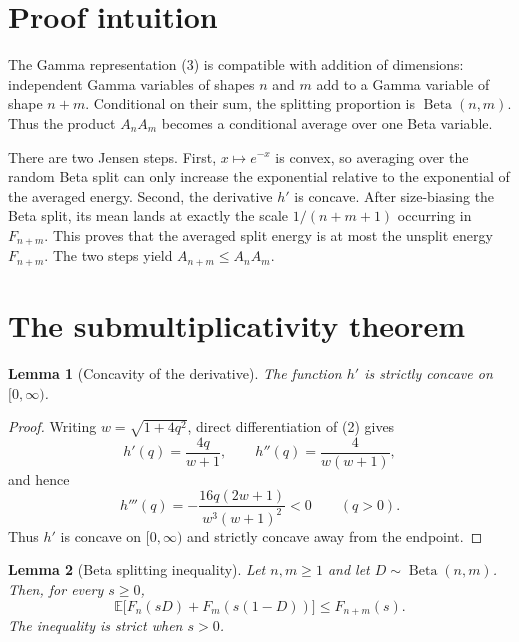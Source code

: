 \documentclass[11pt]{article}
\newtheorem{lemma}{Lemma}
\newcommand{\E}{\mathbb E}
\begin{document}
\section{Proof intuition}

The Gamma representation (3) is compatible with addition of dimensions:
independent Gamma variables of shapes $n$ and $m$ add to a Gamma variable of
shape $n+m$.  Conditional on their sum, the splitting proportion is
$\operatorname{Beta}(n,m)$.  Thus the product $A_nA_m$ becomes a conditional
average over one Beta variable.

There are two Jensen steps.  First, $x\mapsto e^{-x}$ is convex, so averaging
over the random Beta split can only increase the exponential relative to the
exponential of the averaged energy.  Second, the derivative $h'$ is concave.
After size-biasing the Beta split, its mean lands at exactly the scale
$1/(n+m+1)$ occurring in $F_{n+m}$.  This proves that the averaged split
energy is at most the unsplit energy $F_{n+m}$.  The two steps yield
$A_{n+m}\leq A_nA_m$.

\section{The submultiplicativity theorem}

\begin{lemma}[Concavity of the derivative]\label{lem:concavity}
The function $h'$ is strictly concave on $[0,\infty)$.
\end{lemma}

\begin{proof}
Writing $w=\sqrt{1+4q^2}$, direct differentiation of (2) gives
\[
  h'(q)=\frac{4q}{w+1},
  \qquad
  h''(q)=\frac{4}{w(w+1)},
\]
and hence
\[
  h'''(q)=-\frac{16q(2w+1)}{w^3(w+1)^2}<0
  \qquad(q>0).
\]
Thus $h'$ is concave on $[0,\infty)$ and strictly concave away from the
endpoint.
\end{proof}

\begin{lemma}[Beta splitting inequality]\label{lem:beta}
Let $n,m\geq1$ and let $D\sim\operatorname{Beta}(n,m)$.  Then, for every
$s\geq0$,
\[
  \E\bigl[F_n(sD)+F_m(s(1-D))\bigr]\leq F_{n+m}(s).       \tag{4}
\]
The inequality is strict when $s>0$.
\end{lemma}
\end{document}
